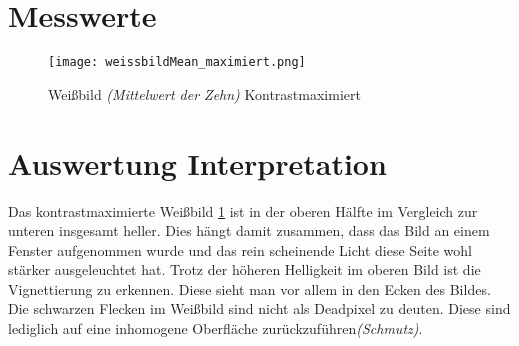 \section{Messwerte}
\label{chap:VERSUCH_3_MESSWERTE}
\begin{figure}[H]
\centering
\texttt{[image: weissbildMean\_maximiert.png]}
\caption{Weißbild \textit{(Mittelwert der Zehn)} Kontrastmaximiert}
\label{img:WeissBild_KontrastMax}
\end{figure}
\section{Auswertung Interpretation}
\label{chap:VERSUCH_3_AUSWERTUNG}
Das kontrastmaximierte Weißbild \ref{img:WeissBild_KontrastMax} ist in der oberen Hälfte im Vergleich zur unteren insgesamt heller. Dies hängt damit zusammen, dass das Bild an einem Fenster aufgenommen wurde und das rein scheinende Licht diese Seite wohl stärker ausgeleuchtet hat. Trotz der höheren Helligkeit im oberen Bild ist die Vignettierung zu erkennen. Diese sieht man vor allem in den Ecken des Bildes. Die schwarzen Flecken im Weißbild sind nicht als Deadpixel zu deuten. Diese sind lediglich auf eine inhomogene Oberfläche zurückzuführen\textit{(Schmutz)}.